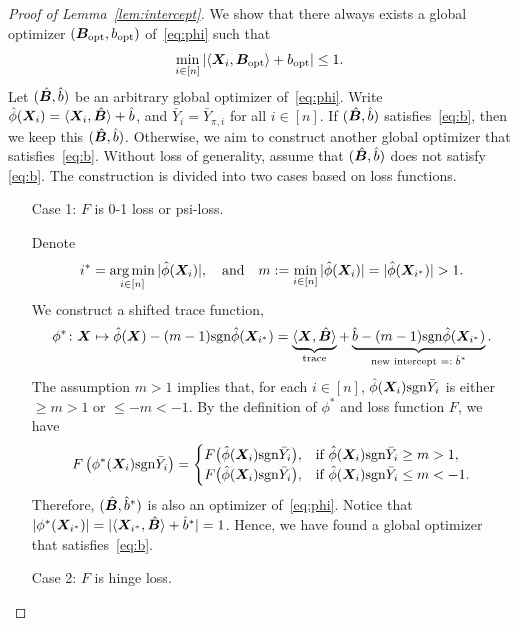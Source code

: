 \documentclass[11pt]{article}
\newcommand*{\KeepStyleUnderBrace}[1]{%
\mathop{%
\mathchoice
{\underbrace{\displaystyle#1}}%
{\underbrace{\textstyle#1}}%
{\underbrace{\scriptstyle#1}}%
{\underbrace{\scriptscriptstyle#1}}%
}\limits
}
\theoremstyle{plain}
\theoremstyle{definition}
\def\sign{\textup{sgn}}
\begin{document}
\begin{proof}[Proof of Lemma~\ref{lem:intercept}]
We show that there always exists a global optimizer $(\bm B_{\text{opt}}, b_{\text{opt}})$ of~\eqref{eq:phi} such that 
\begin{equation}\label{eq:b}
\min_{i\in [n]} |\langle \bm X_i, \bm B_{\text{opt}} \rangle +b_{\text{opt}}|\leq 1.
\end{equation}
Let $(\hat {\bm B}, \hat b)$ be an arbitrary global optimizer of~\eqref{eq:phi}. Write $\hat \phi(\bm X_i)=\langle \bm X_i, \hat {\bm B} \rangle+\hat b$, and $\bar Y_i=\bar Y_{\pi,i}$ for all $i\in[n]$. If $(\hat {\bm B}, \hat b)$ satisfies~\eqref{eq:b}, then we keep this $(\hat {\bm B}, \hat b)$. Otherwise, we aim to construct another global optimizer that satisfies~\eqref{eq:b}. Without loss of generality, assume that $(\hat {\bm B}, \hat b)$ does not satisfy \eqref{eq:b}. The construction is divided into two cases based on loss functions. 
\begin{enumerate}[label={2.\arabic*},wide, labelwidth=!, labelindent=0pt]
\item[Case 1:] $F$ is 0-1 loss or psi-loss. 

Denote
\[
i^*=\argmin_{i\in[n]}|\hat \phi(\mX_i)|, \quad \text{and}\quad m:= \min_{i\in[n]}|\hat \phi(\mX_i)|=|\hat \phi(\mX_{i^*})|>1.
\]
We construct a shifted trace function,
\[
\phi^*\colon \mX\mapsto \hat \phi(\mX) - (m-1)\sign\hat \phi(\mX_{i^*}) = \KeepStyleUnderBrace{\langle \mX, \hat \mB \rangle}_{\text{trace}}+\KeepStyleUnderBrace{\hat b -(m-1)\sign\hat \phi(\mX_{i^*}) }_{\text{new intercept $=:\hat b^*$}}.
\]
The assumption $m>1$ implies that, for each $i\in[n]$, $\hat \phi(\mX_i) \sign \bar Y_{i}$ is either $\geq m>1$ or $\leq -m <-1$. By the definition of $\phi^*$ and loss function $F$, we have
\[
F\left(\phi^*(\mX_i)\sign \bar Y_{i}\right)=
\begin{cases}
F\big(\hat \phi(\mX_i)\sign \bar Y_{i}\big),   & \text{if $\hat \phi(\mX_i) \sign \bar Y_{i}\geq m>1$},\\
F\big(\hat \phi(\mX_i)\sign \bar Y_{i}\big),   & \text{if $\hat \phi(\mX_i) \sign \bar Y_{i}\leq m< -1$}.\\
\end{cases}
\]
Therefore, $(\hat {\bm B}, \hat b^*)$ is also an optimizer of~\eqref{eq:phi}. Notice that $|\phi^*(\bm X_{i^*})|=|\langle \bm X_{i^*},\hat {\bm B} \rangle+\hat b^*|=1$. Hence, we have found a global optimizer that satisfies~\eqref{eq:b}.
\item[Case 2:] $F$ is hinge loss. 


\end{enumerate}
\end{proof}
\end{document}
